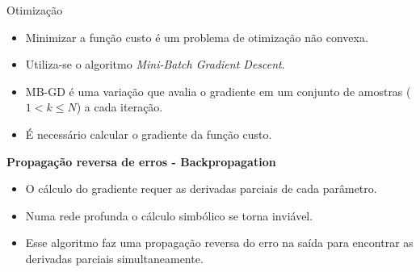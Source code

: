 \begin{frame}{Otimização}
	\begin{itemize}
		\item Minimizar a função custo é um problema de otimização não convexa.
		\item Utiliza-se o algoritmo \emph{Mini-Batch Gradient Descent}.
		\item MB-GD é uma variação que avalia o gradiente em um conjunto de amostras ($1 < k \leq N$) a cada iteração.
		\item É necessário calcular o gradiente da função custo.
	\end{itemize}

	\pause

	\textbf{Propagação reversa de erros - Backpropagation} \\
	\begin{itemize}
		\item O cálculo do gradiente requer as derivadas parciais de cada parâmetro.
		\item Numa rede profunda o cálculo simbólico se torna inviável.
		\item Esse algoritmo faz uma propagação reversa do erro na saída para encontrar as derivadas parciais simultaneamente.
	\end{itemize}
\end{frame}
